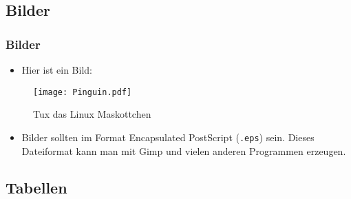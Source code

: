 \subsection{Bilder}


\begin{frame}
	\frametitle{Bilder}
	\begin{itemize}
		\item Hier ist ein Bild:
	\end{itemize}
	
	\begin{figure}
		\centering
		\texttt{[image: Pinguin.pdf]}
		\label{fig:tux}
		\caption[Tux das Linux Maskottchen]{Tux das Linux Maskottchen}
	\end{figure}		
	\begin{itemize}
		\item Bilder sollten im Format Encapsulated PostScript (\texttt{.eps}) sein. Dieses Dateiformat kann man mit Gimp und vielen anderen Programmen erzeugen.
	\end{itemize}
\end{frame}


\subsection{Tabellen}


